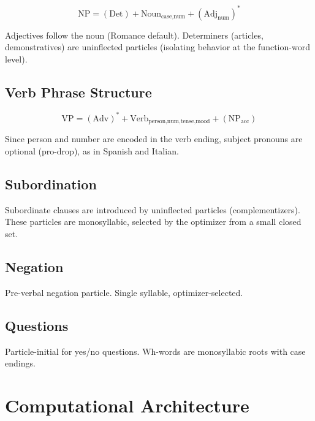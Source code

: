 \documentclass[12pt]{book}
\begin{document}
\begin{equation}
\text{NP} = (\text{Det}) + \text{Noun}_{\text{case,num}} + (\text{Adj}_{\text{num}})^*
\end{equation}

Adjectives follow the noun (Romance default). Determiners (articles,
demonstratives) are uninflected particles (isolating behavior at the
function-word level).

\section{Verb Phrase Structure}

\begin{equation}
\text{VP} = (\text{Adv})^* + \text{Verb}_{\text{person,num,tense,mood}} + (\text{NP}_{\text{acc}})
\end{equation}

Since person and number are encoded in the verb ending, subject pronouns
are optional (pro-drop), as in Spanish and Italian.

\section{Subordination}

Subordinate clauses are introduced by uninflected particles (complementizers).
These particles are monosyllabic, selected by the optimizer from a small
closed set.

\section{Negation}

Pre-verbal negation particle. Single syllable, optimizer-selected.

\section{Questions}

Particle-initial for yes/no questions. Wh-words are monosyllabic roots
with case endings.


\chapter{Computational Architecture}
\label{ch:architecture}
\end{document}
